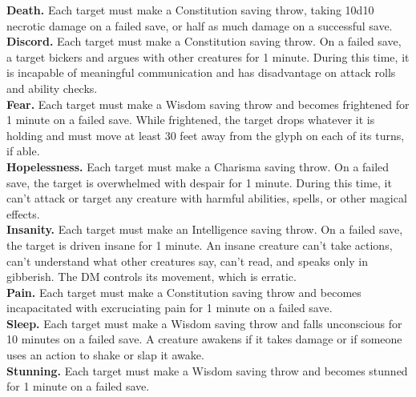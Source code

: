 \documentclass[11pt, A4paper, english]{article}
\begin{document}
\textbf{Death.} Each target must make a Constitution saving throw, taking 10d10 necrotic damage on a failed save, or half as much damage on a successful save. \\
\textbf{Discord.} Each target must make a Constitution saving throw. On a failed save, a target bickers and argues with other creatures for 1 minute. During this time, it is incapable of meaningful communication and has disadvantage on attack rolls and ability checks. \\
\textbf{Fear.} Each target must make a Wisdom saving throw and becomes frightened for 1 minute on a failed save. While frightened, the target drops whatever it is holding and must move at least 30 feet away from the glyph on each of its turns, if able. \\
\textbf{Hopelessness.} Each target must make a Charisma saving throw. On a failed save, the target is overwhelmed with despair for 1 minute. During this time, it can’t attack or target any creature with harmful abilities, spells, or other magical effects. \\
\textbf{Insanity.} Each target must make an Intelligence saving throw. On a failed save, the target is driven insane for 1 minute. An insane creature can’t take actions, can't understand what other creatures say, can’t read, and speaks only in gibberish. The DM controls its movement, which is erratic. \\
\textbf{Pain.} Each target must make a Constitution saving throw and becomes incapacitated with excruciating pain for 1 minute on a failed save. \\
\textbf{Sleep.} Each target must make a Wisdom saving throw and falls unconscious for 10 minutes on a failed save. A creature awakens if it takes damage or if someone uses an action to shake or slap it awake. \\
\textbf{Stunning.} Each target must make a Wisdom saving throw and becomes stunned for 1 minute on a failed save.
\end{document}
